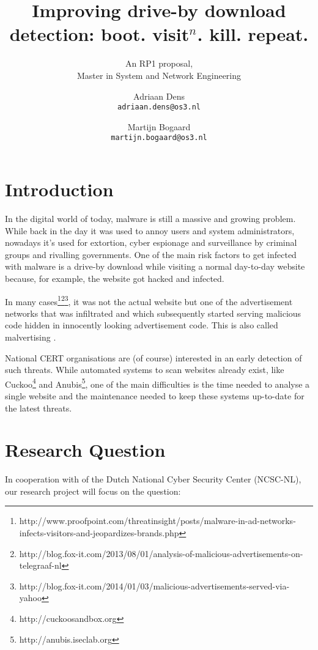\documentclass{scrartcl}
\title{Improving drive-by download detection: boot. visit$^n$. kill. repeat.}
\subtitle{An RP1 proposal,\\Master in System and Network Engineering}
\author{
  Adriaan Dens\\
   \texttt{adriaan.dens@os3.nl}
  \and
  Martijn Bogaard\\
   \texttt{martijn.bogaard@os3.nl}
}
\begin{document}
\maketitle

\section{Introduction}

In the digital world of today, malware is still a massive and growing problem. While back in the day it was used to annoy users and system administrators, nowadays it's used for extortion, cyber espionage and surveillance by criminal groups and rivalling governments. One of the main risk factors to get infected with malware is a drive-by download while visiting a normal day-to-day website because, for example, the website got hacked and infected. 

In many cases\footnote{http://www.proofpoint.com/threatinsight/posts/malware-in-ad-networks-infects-visitors-and-jeopardizes-brands.php}\footnote{http://blog.fox-it.com/2013/08/01/analysis-of-malicious-advertisements-on-telegraaf-nl}\footnote{http://blog.fox-it.com/2014/01/03/malicious-advertisements-served-via-yahoo}, it was not the actual website but one of the advertisement networks that was infiltrated and which subsequently started serving malicious code hidden in innocently looking advertisement code. This is also called malvertising \cite{Li2012}.


National CERT organisations are (of course) interested in an early detection of such threats. While automated systems to scan websites already exist, like Cuckoo\footnote{http://cuckoosandbox.org} and Anubis\footnote{http://anubis.iseclab.org}, one of the main difficulties is the time needed to analyse a single website and the maintenance needed to keep these systems up-to-date for the latest threats.

\section{Research Question}
In cooperation with of the Dutch National Cyber Security Center (NCSC-NL), our research project will focus on the question:\\ %
\end{document}
